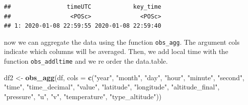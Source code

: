 \documentclass[10pt,a4paper,onecolumn]{article}
\newenvironment{Shaded}{\begin{snugshade}}{\end{snugshade}}
\newcommand{\AttributeTok}[1]{\textcolor[rgb]{0.13,0.29,0.53}{#1}}
\newcommand{\DecValTok}[1]{\textcolor[rgb]{0.00,0.00,0.81}{#1}}
\newcommand{\FunctionTok}[1]{\textcolor[rgb]{0.13,0.29,0.53}{\textbf{#1}}}
\newcommand{\NormalTok}[1]{#1}
\newcommand{\OtherTok}[1]{\textcolor[rgb]{0.56,0.35,0.01}{#1}}
\newcommand{\SpecialCharTok}[1]{\textcolor[rgb]{0.81,0.36,0.00}{\textbf{#1}}}
\newcommand{\StringTok}[1]{\textcolor[rgb]{0.31,0.60,0.02}{#1}}
\begin{document}
\begin{Shaded}
\end{Shaded}

\begin{verbatim}
##                timeUTC            key_time
##                 <POSc>              <POSc>
## 1: 2020-01-08 22:59:55 2020-01-08 22:59:40
\end{verbatim}

now we can aggregate the data using the function \texttt{obs\_agg}. The
argument cols indicate which columns will be averaged. Then, we add
local time with the function \texttt{obs\_addltime} and we re order the
data.table.

\begin{Shaded}
\begin{Highlighting}[]
\NormalTok{df2 }\OtherTok{\textless{}{-}} \FunctionTok{obs\_agg}\NormalTok{(df, }
               \AttributeTok{cols =}  \FunctionTok{c}\NormalTok{(}\StringTok{"year"}\NormalTok{, }\StringTok{"month"}\NormalTok{, }\StringTok{"day"}\NormalTok{, }\StringTok{"hour"}\NormalTok{, }\StringTok{"minute"}\NormalTok{, }\StringTok{"second"}\NormalTok{,}
                         \StringTok{"time"}\NormalTok{, }\StringTok{"time\_decimal"}\NormalTok{,  }\StringTok{"value"}\NormalTok{,}
                         \StringTok{"latitude"}\NormalTok{, }\StringTok{"longitude"}\NormalTok{, }\StringTok{"altitude\_final"}\NormalTok{,}
                         \StringTok{"pressure"}\NormalTok{, }\StringTok{"u"}\NormalTok{, }\StringTok{"v"}\NormalTok{, }\StringTok{"temperature"}\NormalTok{, }\StringTok{"type\_altitude"}\NormalTok{))}
\end{Highlighting}
\end{Shaded}
\end{document}
